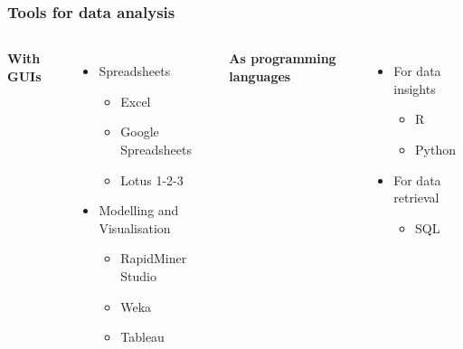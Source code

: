 \documentclass[aspectratio=169]{beamer}
\begin{document}
\begin{frame}
    \frametitle{Tools for data analysis}
    \begin{columns}[t]
            {\large \textbf{With GUIs}}
            \begin{itemize}
                \item Spreadsheets
                \begin{itemize}
                    \item Excel
                    \item Google Spreadsheets
                    \item Lotus 1-2-3
                \end{itemize}
                \item Modelling and Visualisation
                \begin{itemize}
                    \item RapidMiner Studio
                    \item Weka
                    \item Tableau
                \end{itemize}
            \end{itemize}
            {\large \textbf{As programming languages}}
            \begin{itemize}
                \item For data insights
                \begin{itemize}
                    \item R
                    \item Python
                \end{itemize}
                \item For data retrieval
                \begin{itemize}
                    \item SQL
                \end{itemize}
            \end{itemize}
    \end{columns}
\end{frame}
\end{document}
